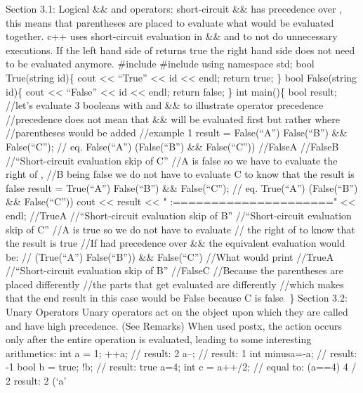 Section 3.1: Logical \&\& and \textbar\textbar{} operators:
short-circuit \&\& has precedence over \textbar\textbar, this means that
parentheses are placed to evaluate what would be evaluated together. c++
uses short-circuit evaluation in \&\& and \textbar\textbar{} to not do
unnecessary executions. If the left hand side of \textbar\textbar{}
returns true the right hand side does not need to be evaluated anymore.
\#include \#include using namespace std; bool True(string id)\{ cout
\textless\textless{} ``True'' \textless\textless{} id
\textless\textless{} endl; return true; \} bool False(string id)\{ cout
\textless\textless{} ``False'' \textless\textless{} id
\textless\textless{} endl; return false; \} int main()\{ bool result;
//let's evaluate 3 booleans with \textbar\textbar{} and \&\& to
illustrate operator precedence //precedence does not mean that \&\& will
be evaluated first but rather where\\
//parentheses would be added //example 1 result = False(``A'')
\textbar\textbar{} False(``B'') \&\& False(``C''); // eq. False(``A'')
\textbar\textbar{} (False(``B'') \&\& False(``C'')) //FalseA //FalseB
//``Short-circuit evaluation skip of C'' //A is false so we have to
evaluate the right of \textbar\textbar, //B being false we do not have
to evaluate C to know that the result is false result = True(``A'')
\textbar\textbar{} False(``B'') \&\& False(``C''); // eq. True(``A'')
\textbar\textbar{} (False(``B'') \&\& False(``C'')) cout
\textless\textless{} result \textless\textless{} "
:=====================" \textless\textless{} endl; //TrueA
//``Short-circuit evaluation skip of B'' //``Short-circuit evaluation
skip of C'' //A is true so we do not have to evaluate // the right of
\textbar\textbar{} to know that the result is true //If
\textbar\textbar{} had precedence over \&\& the equivalent evaluation
would be: // (True(``A'') \textbar\textbar{} False(``B'')) \&\&
False(``C'') //What would print //TrueA //``Short-circuit evaluation
skip of B'' //FalseC //Because the parentheses are placed differently
//the parts that get evaluated are differently //which makes that the
end result in this case would be False because C is false \} Section
3.2: Unary Operators Unary operators act on the object upon which they
are called and have high precedence. (See Remarks) When used postx, the
action occurs only after the entire operation is evaluated, leading to
some interesting arithmetics: int a = 1; ++a; // result: 2 a--; //
result: 1 int minusa=-a; // result: -1 bool b = true; !b; // result:
true a=4; int c = a++/2; // equal to: (a==4) 4 / 2 result: 2 (`a'
